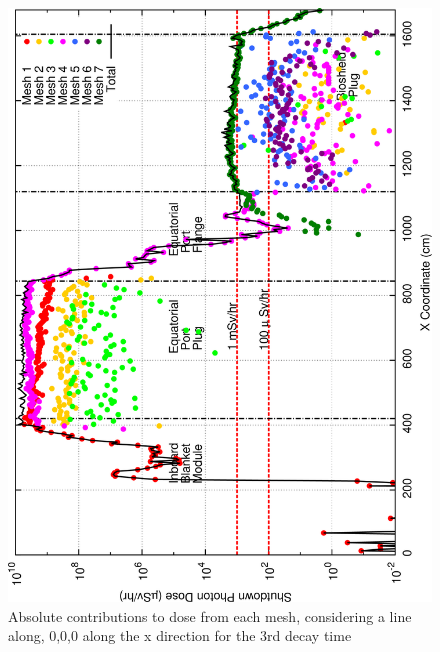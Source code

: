 \documentclass[12pt]{article}
\begin{document}
\begin{figure}[ht!]
\centering
\includegraphics[clip,scale=0.25]{../plots/crosstalk/nob4c/ep/dc3.png}
\caption{Absolute contributions to dose from each mesh, considering a line along, 0,0,0 along the x direction for the 3rd decay time}
\label{fig:ct_ep_dc3}
\end{figure}
\end{document}
